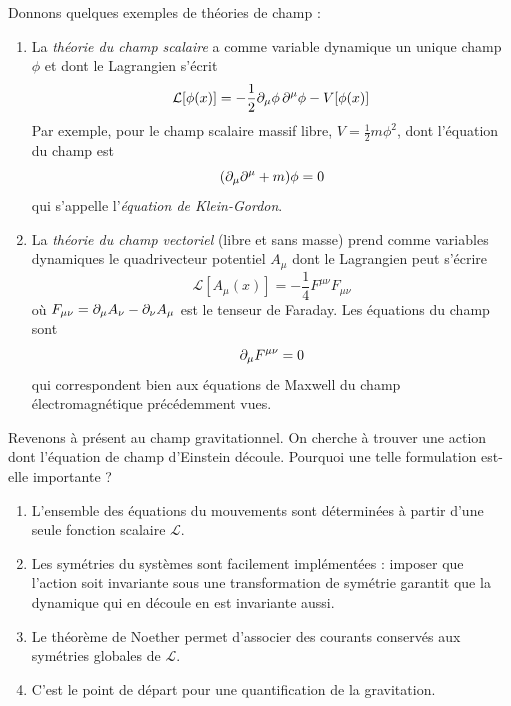\begin{exmp}
    Donnons quelques exemples de théories de champ :
    \begin{enumerate}
        \item La \emph{théorie du champ scalaire} a comme variable dynamique un unique champ $\phi$ et dont le Lagrangien s'écrit
        \begin{equation}
            \mathcal{L}[\phi(x)] = -\frac{1}{2}\partial_\mu \phi \, \partial^\mu \phi -V [\phi(x)]
        \end{equation}
        Par exemple, pour le champ scalaire massif libre, $V = \frac{1}{2} m \phi^2$, dont l'équation du champ est
        \begin{equation}
            (\partial_\mu \partial^\mu + m)\phi = 0
        \end{equation}
        qui s'appelle l'\emph{équation de Klein-Gordon}.
        \item La \emph{théorie du champ vectoriel} (libre et sans masse) prend comme variables dynamiques le quadrivecteur potentiel $A_\mu$ dont le Lagrangien peut s'écrire
        \begin{equation}
            \mathcal{L}[A_\mu(x)] = -\frac{1}{4} F^{\mu\nu} F_{\mu\nu}
        \end{equation}
        où $F_{\mu\nu} = \partial_\mu A_\nu - \partial_\nu A_\mu$ est le tenseur de Faraday. Les équations du champ sont
        \begin{equation}
            \partial_\mu F^{\mu\nu} = 0
        \end{equation}
        qui correspondent bien aux équations de Maxwell du champ électromagnétique précédemment vues.
    \end{enumerate}
\end{exmp}
\cutebreak
Revenons à présent au champ gravitationnel. On cherche à trouver une action dont l'équation de champ d'Einstein découle. Pourquoi une telle formulation est-elle importante ?
\begin{enumerate}
    \item L'ensemble des équations du mouvements sont déterminées à partir d'une seule fonction scalaire $\mathcal{L}$. 
    \item Les symétries du systèmes sont facilement implémentées : imposer que l'action soit invariante sous une transformation de symétrie garantit que la dynamique qui en découle en est invariante aussi.
    \item Le théorème de Noether permet d'associer des courants conservés aux symétries globales de $\mathcal{L}$. 
    \item C'est le point de départ pour une quantification de la gravitation.
\end{enumerate}

